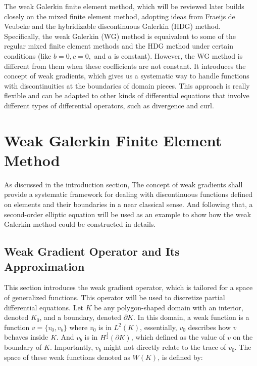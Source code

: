 \documentclass[12pt]{article} %
\begin{document}
The weak Galerkin finite element method, which will be reviewed later builds closely on the mixed finite element method, adopting ideas from Fraeijs 
de Veubeke \cite{Veubeke1965} and the hybridizable discontinuous Galerkin (HDG) method\cite{Cockburn2009}. 
Specifically, the weak Galerkin (WG) method is equaivalent to some of the regular mixed finite element methods and the HDG 
method under certain conditions (like \( b = 0, c = 0, \) and \( a \) is constant). However, the WG method is different from them when these 
coefficients are not constant. It introduces the concept of weak gradients, which gives us a systematic way to handle functions  
with discontinuities at the boundaries of domain pieces. This approach is really flexible and can be adapted to other kinds of 
differential equations that involve different types of differential operators, such as divergence and curl\cite{Wang2013}.



\section{Weak Galerkin Finite Element Method}
As discussed in the introduction section, The concept of weak gradients shall provide a systematic
framework for dealing with discontinuous functions defined on elements and their boundaries in a near classical sense\cite{Wang2013}. And following that, a second-order elliptic equation will be used as an example to show how the weak Galerkin method could be constructed in details.
\subsection{Weak Gradient Operator and Its Approximation}

This section introduces the weak gradient operator, which is tailored for a space of generalized functions. This operator will be used to discretize 
partial differential equations. Let \(K\) be any polygon-shaped domain with an interior, denoted \(K_0\), and a boundary, denoted \(\partial K\). 
In this domain, a weak function is a function \(v = \{v_0, v_b\}\) where \(v_0\) is in \(L^2(K)\), essentially, \(v_0\) describes how \(v\) behaves 
inside \(K\). And \(v_b\) is in \(H^{\frac{1}{2}}(\partial K)\), which defined as the value of \(v\) on the boundary of \(K\). 
Importantly, \(v_b\) might not directly relate to the trace of \(v_0\)\cite{Wang2013}. The space of these weak functions denoted as \(W(K)\), is defined by:
\end{document}
